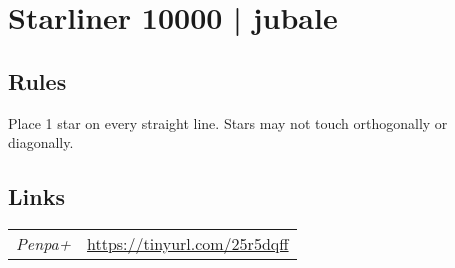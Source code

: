 \section[Starliner 10000 | jubale {[\emph{Star Battle/Lines}]}]{Starliner 10000 | {\normalfont jubale}}
\label{sec:16-starliner-10000-jubale}

\subsection*{Rules}
\begin{markdown}
Place 1 star on every straight line.  Stars may not touch orthogonally or diagonally.
\end{markdown}
\subsection*{Links}
\begin{tabularx}{\textwidth}{l X}
\emph{Penpa+} & \url{https://tinyurl.com/25r5dqff} \\
\end{tabularx}
\pagebreak
